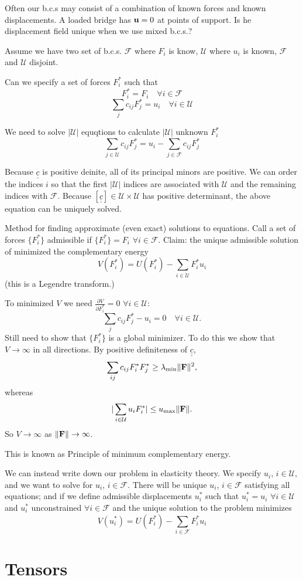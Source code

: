 \documentclass[12pt]{article}
\newcommand{\uu}{{\bf u}}
\newcommand{\FF}{{\bf F}}
\newcommand{\cc}{{\underline{\underline c}}}
\newcommand{\UU}{{\mathcal U}}
\newcommand{\cF}{{\mathcal F}}
\begin{document}
\bigskip
\bigskip
Often our b.c.s may consist of a combination of known forces and known displacements. A loaded bridge has $\uu=0$ at points of support. Is he displacement field unique when we use mixed b.c.s.?

Assume we have two set of b.c.s. $\cF$ where $F_i$ is know, $\UU$ where $u_i$ is known, $\cF$ and $\UU$ disjoint.

Can we specify a set of forces $F_i^*$ such that 
\[
F_i^*  = F_i \quad  \forall i\in \cF
\]
\[
\sum_jc_{ij}F_j^*  = u_i \quad \forall i\in \UU
\]

We need to solve $|\UU|$ equqtions to calculate $|\UU|$ unknown $F_i^*$
\[
\sum_{j\in \UU} c_{ij}F_j^* = u_i - \sum_{j\in\cF} c_{ij}F_j^*
\]

Because $\cc$ is positive deinite, all of its principal minors are positive. We can order the indices $i$ so that the first $|\UU|$ indices are associated with $\UU$ and the remaining indices with $\cF$.
Because $[\cc]\in\UU\times\UU$ has positive determinant, the above equation can be uniquely solved.

Method for finding approximate (even exact) solutions to equations.
Call a set of forces $\{F_i^*\}$ admissible if $\{F_i^*\} = F_i$ $\forall i\in\cF$.
Claim: the unique admissible solution of minimized the complementary energy
\[
V(F_i^*) = U(F_i^*) - \sum_{i\in\UU} F_i^*u_i
\]
(this is a Legendre transform.)

To minimized $V$ we need $\frac{\partial V}{\partial F_i^*}=0$ $\forall i\in\UU$:
\[
\sum_jc_{ij}F_j^* - u_i=0 \quad \forall i\in\UU.
\]
Still need to show that $\{F_i^*\}$ is a global minimizer. To do this we show that $V\to \infty$ in all directions.
By positive definiteness of $\cc$, 
\[
\sum_{ij} c_{ij}  F_i^* F_j^* \geq \lambda_{\min}\|\FF\|^2,
\]
whereas
\[
|\sum_{i\in\UU}u_iF_i^*| \leq u_{\max} \|\FF\|.
\]
So $V\to\infty$ as $\|\FF\|\to\infty$.

This is known as Principle of minimum complementary energy.

We can instead write down our problem in elasticity theory. 
We specify $u_i$, $i\in\UU$, and we want to solve for  $u_i$, $i\in\cF$. There will be unique $u_i$, $i\in\cF$ satisfying all equations; and if we define admissible displacements $u_i^*$ such that  $u_i^* = u_i$ $\forall i\in\UU$ and $u_i^*$ unconstrained $\forall i\in\cF$ and the unique solution to the problem minimizes 
\[
V(u_i^*) = U(F_i^*) - \sum_{i\in\cF} F_i^*u_i
\]

\section{Tensors}
\end{document}

